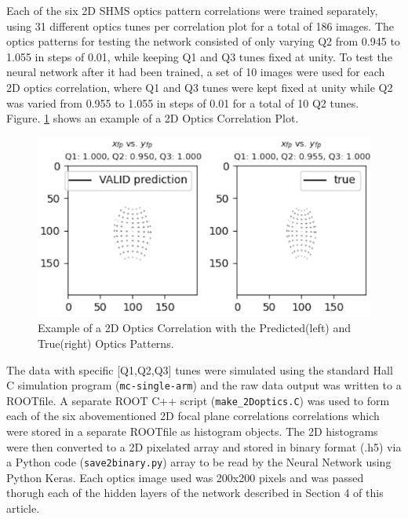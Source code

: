 \documentclass[conference]{IEEEtran}
\begin{document}
Each of the six 2D SHMS optics pattern correlations were trained separately, using 31 different optics tunes
per correlation plot for a total of 186 images. The optics patterns for testing the network consisted of only
varying Q2 from 0.945 to 1.055 in steps of 0.01, while keeping Q1 and Q3 tunes fixed at unity.
To test the neural network after it had been trained, a set of 10 images were used for each 2D optics correlation, where Q1 and Q3
tunes were kept fixed at unity while Q2 was varied from 0.955 to 1.055 in steps of 0.01 for a total of 10 Q2 tunes.\\ Figure. \ref{fig:2d_correlation2} shows an example of a 2D Optics Correlation Plot.




\begin{figure}[h]
 \centering
  \includegraphics[scale=0.2]{images/2d_correlation2.png}
  \caption{Example of a 2D Optics Correlation with the Predicted(left) and True(right) Optics Patterns.}
  \label{fig:2d_correlation2}
\end{figure}

The data with specific [Q1,Q2,Q3] tunes were simulated using the standard Hall C simulation program (\texttt{mc-single-arm})
and the raw data output was written to a ROOTfile. A separate ROOT C++ script (\texttt{make\_2Doptics.C}) was used to form each of
the six abovementioned 2D focal plane correlations correlations which were stored in a separate ROOTfile as histogram objects.
The 2D histograms were then converted to a 2D pixelated array and stored in binary format (.h5) via a Python code (\texttt{save2binary.py})
array to be read by the Neural Network using Python Keras. Each optics image used was 200x200 pixels and was passed thorugh each of
the hidden layers of the network described in Section 4 of this article.
\end{document}
